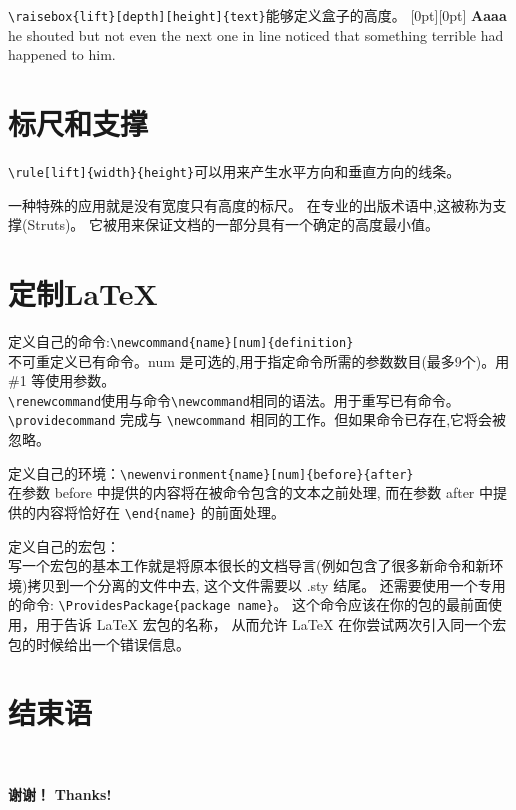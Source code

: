 \documentclass[12pt, a4paper, onecolumn, notitlepage]{article}
\begin{document}
\verb+\raisebox{lift}[depth][height]{text}+能够定义盒子的高度。
\raisebox{0pt}[0pt][0pt]{\Large%
\textbf{Aaaa\raisebox{-0.3ex}{a}%
\raisebox{-0.7ex}{aa}%
\raisebox{-1.2ex}{r}%
\raisebox{-2.2ex}{g}%
\raisebox{-4.5ex}{h}}}
he shouted but not even the next one in line noticed that
something terrible had happened to him.
\section{标尺和支撑}
\verb-\rule[lift]{width}{height}-可以用来产生水平方向和垂直方向的线条。

一种特殊的应用就是没有宽度只有高度的标尺。
在专业的出版术语中,这被称为支撑(Struts)。
它被用来保证文档的一部分具有一个确定的高度最小值。
\section{定制\LaTeX}
定义自己的命令:\verb+\newcommand{name}[num]{definition}+\\
不可重定义已有命令。num 是可选的,用于指定命令所需的参数数目(最多9个)。用 \#1 等使用参数。\\
\verb+\renewcommand+使用与命令\verb-\newcommand-相同的语法。用于重写已有命令。\\
\verb-\providecommand- 完成与 \verb-\newcommand- 相同的工作。但如果命令已存在,它将会被忽略。\\ \text{}

定义自己的环境：\verb-\newenvironment{name}[num]{before}{after}-\\
在参数 before 中提供的内容将在被命令包含的文本之前处理,
而在参数 after 中提供的内容将恰好在 \verb-\end{name}- 的前面处理。\\ \text{}

定义自己的宏包：\\
写一个宏包的基本工作就是将原本很长的文档导言(例如包含了很多新命令和新环境)拷贝到一个分离的文件中去,
这个文件需要以 .sty 结尾。
还需要使用一个专用的命令: \verb-\ProvidesPackage{package name}-。
这个命令应该在你的包的最前面使用，用于告诉 LaTeX 宏包的名称，
从而允许 LaTeX 在你尝试两次引入同一个宏包的时候给出一个错误信息。
\renewcommand{\appendixname}{附录}
\appendix
\section{结束语}
\text{} \\ \text{}

\textbf{\Huge{\textcolor[rgb]{1.00,0.00,0.00}{\kai 谢谢！}}}
\textbf{\Huge{\textcolor[rgb]{0.00,0.50,1.00}{\hei Thanks!}}}
\printindex
\end{document}
